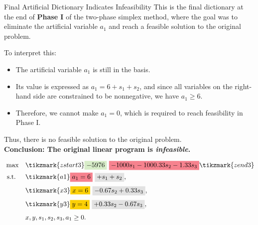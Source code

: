 \begin{remark}{Final Artificial Dictionary Indicates Infeasibility}{}
This is the final dictionary at the end of \textbf{Phase I} of the two-phase simplex method, where the goal was to eliminate the artificial variable \(a_1\) and reach a feasible solution to the original problem.

To interpret this:
\begin{itemize}
    \item The artificial variable \(a_1\) is still in the basis.
    \item Its value is expressed as \(a_1 = 6 + s_1 + s_2\), and since all variables on the right-hand side are constrained to be nonnegative, we have \(a_1 \ge 6\).
    \item Therefore, we cannot make \(a_1 = 0\), which is required to reach feasibility in Phase I.
\end{itemize}

Thus, there is no feasible solution to the original problem.  \\
\textbf{Conclusion: The original linear program is \emph{infeasible}.}

\vspace{1cm}

\[
\begin{aligned}
\max \quad 
& \tikzmark{zstart3} \text{\colorbox{green!20!white}{$-5976$}} ~ \text{\colorbox{red!50!white}{$- 1000s_1 - 1000.33s_2 - 1.33s_3$}} \tikzmark{zend3} \\
\st \quad 
& \tikzmark{a1} \text{\colorbox{red!50!white}{$a_1 = 6$}} ~ \text{\colorbox{gray!20!white}{$+ s_1 + s_2$}},\\[1mm]
& \tikzmark{x3} \text{\colorbox{yellow}{$x = 6$}} ~ \text{\colorbox{gray!20!white}{$- 0.67s_2 + 0.33s_3$}},\\[1mm]
& \tikzmark{y3} \text{\colorbox{yellow}{$y = 4$}} ~ \text{\colorbox{gray!20!white}{$+ 0.33s_2 - 0.67s_3$}},\\[1mm]
& x, y, s_1, s_2, s_3, a_1 \geq 0.
\end{aligned}
\]

\end{remark}

